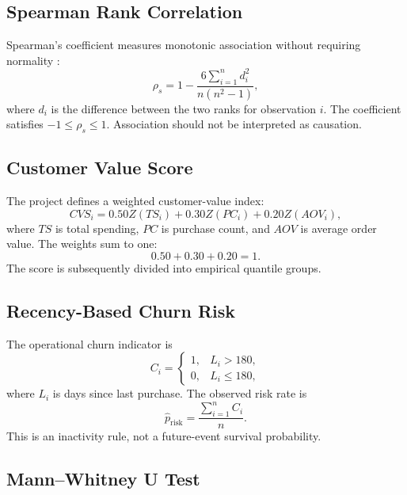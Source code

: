 \documentclass[11pt,a4paper]{article}
\begin{document}
\subsection{Spearman Rank Correlation}

Spearman's coefficient measures monotonic association without requiring
normality \cite{spearman}:
\begin{equation}
\rho_s=
1-\frac{6\sum_{i=1}^{n}d_i^2}{n(n^2-1)},
\end{equation}
where $d_i$ is the difference between the two ranks for observation $i$.
The coefficient satisfies $-1\leq\rho_s\leq1$. Association should not be
interpreted as causation.

\subsection{Customer Value Score}

The project defines a weighted customer-value index:
\begin{equation}
CVS_i=
0.50Z(TS_i)+0.30Z(PC_i)+0.20Z(AOV_i),
\end{equation}
where $TS$ is total spending, $PC$ is purchase count, and $AOV$ is average
order value. The weights sum to one:
\begin{equation}
0.50+0.30+0.20=1.
\end{equation}
The score is subsequently divided into empirical quantile groups.

\subsection{Recency-Based Churn Risk}

The operational churn indicator is
\begin{equation}
C_i=
\begin{cases}
1,&L_i>180,\\
0,&L_i\leq180,
\end{cases}
\end{equation}
where $L_i$ is days since last purchase. The observed risk rate is
\begin{equation}
\hat p_{\mathrm{risk}}=
\frac{\sum_{i=1}^{n}C_i}{n}.
\end{equation}
This is an inactivity rule, not a future-event survival probability.

\subsection{Mann--Whitney U Test}
\end{document}

